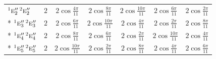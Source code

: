 \documentclass[10pt,a4paper]{article}
\numberwithin{equation}{section}
\newcommand{\irr}[1]{\text{\normalfont\scshape #1}}
\newcommand{\conjpair}[1]{{}^{#1}}
\begin{document}
{{\begin{longtable}{@{}lcccccc@{}}
$\conjpair{1}\irr{e}_{2}''\,\conjpair{2}\irr{e}_{2}''$ & $2$ & $2\cos\tfrac{4\pi}{11}$ & $2\cos\tfrac{8\pi}{11}$ & $2\cos\tfrac{10\pi}{11}$ & $2\cos\tfrac{6\pi}{11}$ & $2\cos\tfrac{2\pi}{11}$\\*
$\conjpair{1}\irr{e}_{3}''\,\conjpair{2}\irr{e}_{3}''$ & $2$ & $2\cos\tfrac{6\pi}{11}$ & $2\cos\tfrac{10\pi}{11}$ & $2\cos\tfrac{4\pi}{11}$ & $2\cos\tfrac{2\pi}{11}$ & $2\cos\tfrac{8\pi}{11}$\\*
$\conjpair{1}\irr{e}_{4}''\,\conjpair{2}\irr{e}_{4}''$ & $2$ & $2\cos\tfrac{8\pi}{11}$ & $2\cos\tfrac{6\pi}{11}$ & $2\cos\tfrac{2\pi}{11}$ & $2\cos\tfrac{10\pi}{11}$ & $2\cos\tfrac{4\pi}{11}$\\*
$\conjpair{1}\irr{e}_{5}''\,\conjpair{2}\irr{e}_{5}''$ & $2$ & $2\cos\tfrac{10\pi}{11}$ & $2\cos\tfrac{2\pi}{11}$ & $2\cos\tfrac{8\pi}{11}$ & $2\cos\tfrac{4\pi}{11}$ & $2\cos\tfrac{6\pi}{11}$\\
\bottomrule\end{longtable}}}
\end{document}
